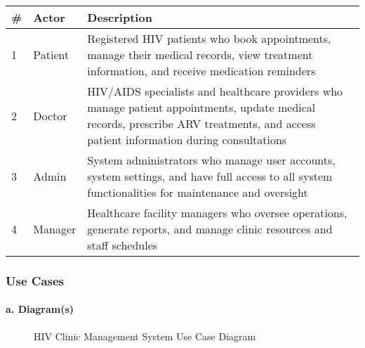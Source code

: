 \documentclass[12pt,a4paper]{article}
\begin{document}
\begin{longtable}{|p{1cm}|p{3cm}|p{10cm}|}
\hline
\textbf{\#} & \textbf{Actor} & \textbf{Description} \\
\hline
1 & Patient & Registered HIV patients who book appointments, manage their medical records, view treatment information, and receive medication reminders \\
\hline
2 & Doctor & HIV/AIDS specialists and healthcare providers who manage patient appointments, update medical records, prescribe ARV treatments, and access patient information during consultations \\
\hline
3 & Admin & System administrators who manage user accounts, system settings, and have full access to all system functionalities for maintenance and oversight \\
\hline
4 & Manager & Healthcare facility managers who oversee operations, generate reports, and manage clinic resources and staff schedules \\
\hline
\end{longtable}

\subsubsection{Use Cases}

\paragraph{a. Diagram(s)}

\begin{figure}
\centering
{}
\caption{HIV Clinic Management System Use Case Diagram}
\label{fig:use-case-diagram}
\end{figure}
\end{document}

